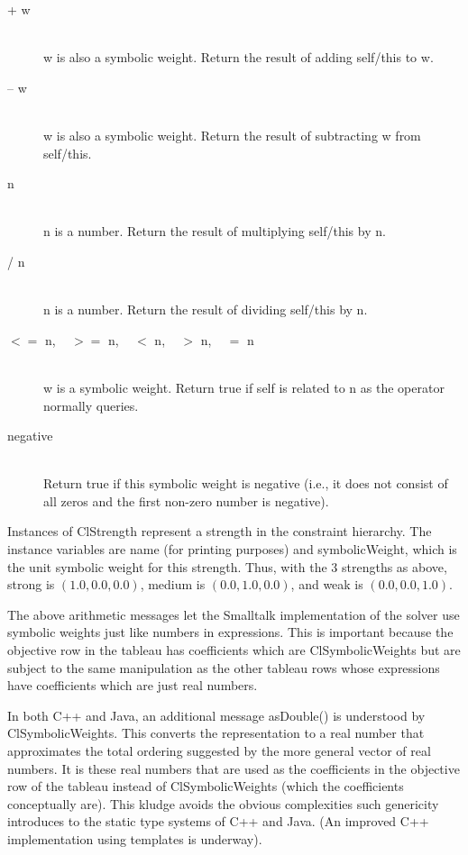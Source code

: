 \documentclass{article}
\begin{document}
\begin{description}

\item[{\sf + w}]  \ \\
{\sf w} is also a symbolic weight.
Return the result of adding {\sf self}/{\sf this} to {\sf w}.  

\item[{\sf -- w}] \ \\
{\sf w} is also a symbolic weight.
Return the result of subtracting {\sf w} from {\sf self}/{\sf this}.

\item[{\sf * n}] \ \\
{\sf n} is a number.
Return the result of multiplying {\sf self}/{\sf this} by {\sf n}.  

\item[{\sf / n}] \ \\
{\sf n} is a number.
Return the result of dividing {\sf self}/{\sf this} by {\sf n}.  

\item[$<=$ {\sf  n}, ~ $>=$ {\sf n}, ~ $<$ {\sf n}, ~ $>$ {\sf n}, ~ $=$ {\sf n}] \ \\
{\sf w} is a symbolic weight.
Return true if {\sf self} is related to {\sf n} as the operator normally
queries.

\item[{\sf negative}] \ \\
Return true if this symbolic weight is negative
(i.e., it does not consist of all zeros and the first non-zero number is
negative). 

\end{description}

Instances of {\sf ClStrength} represent a strength in the constraint
hierarchy.  The instance variables are {\sf name} (for printing
purposes) and {\sf symbolicWeight}, which is the unit symbolic weight
for this strength.  Thus, with the 3 strengths as above, {\sf strong} is
$(1.0, 0.0, 0.0)$, {\sf medium} is $(0.0, 1.0, 0.0)$, and {\sf weak} is
$(0.0, 0.0, 1.0)$.

The above arithmetic messages let the Smalltalk implementation of the
solver use symbolic weights just like numbers in expressions.  This is
important because the objective row in the tableau has coefficients
which are {\sf ClSymbolicWeight}s but are subject to the same
manipulation as the other tableau rows whose expressions have
coefficients which are just real numbers.

In both C++ and Java, an additional message {\sf asDouble()} is understood
by {\sf ClSymbolicWeight}s.  This converts the representation to a real
number that approximates the total ordering suggested by the more
general vector of real numbers.  It is these real numbers that are used
as the coefficients in the objective row of the tableau instead of {\sf
  ClSymbolicWeight}s (which the coefficients conceptually are).  This kludge
avoids the obvious complexities such genericity introduces to the static
type systems of C++ and Java. (An improved C++ implementation using
templates is underway).
\end{document}
